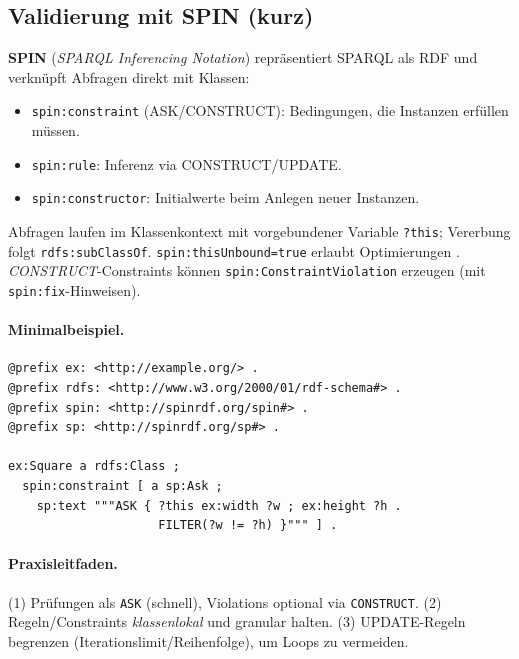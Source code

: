 \subsection{Validierung mit SPIN (kurz)}
\textbf{SPIN} (\emph{SPARQL Inferencing Notation}) repräsentiert SPARQL als RDF und verknüpft Abfragen direkt mit Klassen:
\begin{itemize}
  \item \texttt{spin:constraint} (ASK/CONSTRUCT): Bedingungen, die Instanzen erfüllen müssen.
  \item \texttt{spin:rule}: Inferenz via CONSTRUCT/UPDATE.
  \item \texttt{spin:constructor}: Initialwerte beim Anlegen neuer Instanzen.
\end{itemize}
Abfragen laufen im Klassenkontext mit vorgebundener Variable \texttt{?this}; Vererbung folgt \texttt{rdfs:subClassOf}. \texttt{spin:thisUnbound=true} erlaubt Optimierungen \cite{spin-w3c}. \emph{CONSTRUCT}-Constraints können \texttt{spin:ConstraintViolation} erzeugen (mit \texttt{spin:fix}-Hinweisen).

\paragraph{Minimalbeispiel.}
\begin{lstlisting}[language=turtle,basicstyle=\ttfamily\small]
@prefix ex: <http://example.org/> .
@prefix rdfs: <http://www.w3.org/2000/01/rdf-schema#> .
@prefix spin: <http://spinrdf.org/spin#> .
@prefix sp: <http://spinrdf.org/sp#> .

ex:Square a rdfs:Class ;
  spin:constraint [ a sp:Ask ;
    sp:text """ASK { ?this ex:width ?w ; ex:height ?h .
                     FILTER(?w != ?h) }""" ] .
\end{lstlisting}

\paragraph{Praxisleitfaden.}
(1) Prüfungen als \texttt{ASK} (schnell), Violations optional via \texttt{CONSTRUCT}. (2) Regeln/Constraints \emph{klassenlokal} und granular halten. (3) UPDATE-Regeln begrenzen (Iterationslimit/Reihenfolge), um Loops zu vermeiden.

